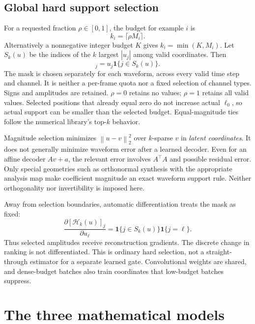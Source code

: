 \documentclass[11pt,a4paper]{article}
\newcommand{\norm}[1]{\left\lVert#1\right\rVert}
\newcommand{\topk}{\mathcal{H}_k}
\begin{document}
\subsection{Global hard support selection}
For a requested fraction $\rho\in[0,1]$, the budget for example $i$ is
\begin{equation}
 k_i=\lceil\rho M_i\rceil.
\end{equation}
Alternatively a nonnegative integer budget $K$ gives $k_i=\min(K,M_i)$. Let $S_k(u)$ be the indices of the $k$ largest $|u_j|$ among valid coordinates. Then
\begin{equation}
 [\topk(u)]_j=u_j\mathbf 1\{j\in S_k(u)\}.
 \label{eq:topk}
\end{equation}
The mask is chosen separately for each waveform, across every valid time step and channel. It is neither a per-frame quota nor a fixed selection of channel types. Signs and amplitudes are retained. $\rho=0$ retains no values; $\rho=1$ retains all valid values. Selected positions that already equal zero do not increase actual $\ell_0$, so actual support can be smaller than the selected budget. Equal-magnitude ties follow the numerical library's top-$k$ behavior.

Magnitude selection minimizes $\norm{u-v}_2^2$ over $k$-sparse $v$ in \emph{latent coordinates}. It does not generally minimize waveform error after a learned decoder. Even for an affine decoder $Av+a$, the relevant error involves $A^\top A$ and possible residual error. Only special geometries such as orthonormal synthesis with the appropriate analysis map make coefficient magnitude an exact waveform support rule. Neither orthogonality nor invertibility is imposed here.

Away from selection boundaries, automatic differentiation treats the mask as fixed:
\begin{equation}
 \frac{\partial[\topk(u)]_j}{\partial u_\ell}
 =\mathbf 1\{j\in S_k(u)\}\mathbf 1\{j=\ell\}.
\end{equation}
Thus selected amplitudes receive reconstruction gradients. The discrete change in ranking is not differentiated. This is ordinary hard selection, not a straight-through estimator for a separate learned gate. Convolutional weights are shared, and dense-budget batches also train coordinates that low-budget batches suppress.

\section{The three mathematical models}
\end{document}
